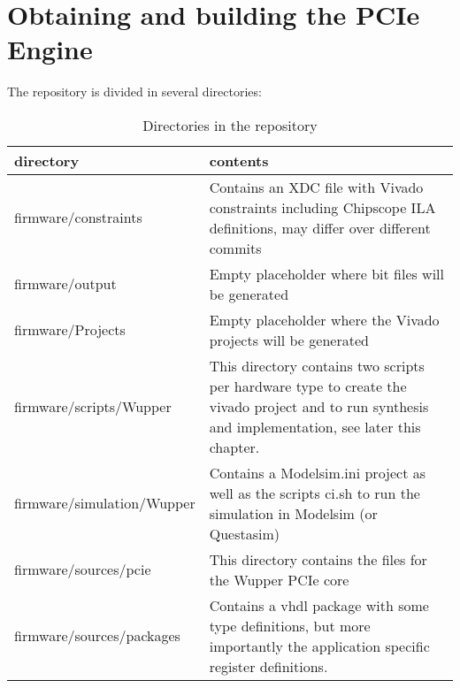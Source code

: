 \section{Obtaining and building the PCIe Engine}
The repository is divided in several directories:
\begin{table}[H]
	\centering
	\begin{tabularx}{\textwidth}{|l|X|}
	\hline
	\textbf{directory}&\textbf{contents}\\
	\hline
	firmware/constraints&Contains an XDC file with Vivado constraints including Chipscope ILA definitions, may differ over different commits\\
	\hline
	firmware/output&Empty placeholder where bit files will be generated\\
	\hline
	firmware/Projects&Empty placeholder where the Vivado projects will be generated\\
	\hline
	firmware/scripts/Wupper&This directory contains two scripts per hardware type to create the vivado project and to run synthesis and implementation, see later this chapter.\\
	\hline
	firmware/simulation/Wupper&Contains a Modelsim.ini project as well as the scripts ci.sh to run the simulation in Modelsim (or Questasim)\\
	\hline
	firmware/sources/pcie&This directory contains the files for the Wupper PCIe core\\
	\hline
	firmware/sources/packages&Contains a vhdl package with some type definitions, but more importantly the application specific register definitions.\\
	\hline		
	
	\end{tabularx}
	\caption{Directories in the repository}\label{tab:directories}
\end{table}


